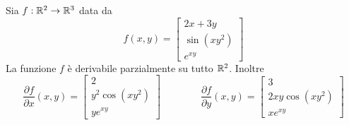 \begin{example}
	Sia $f: \mathbb{R}^2 \to \mathbb{R}^3$ data da
	\begin{equation*}
		f(x,y) =
		\begin{bmatrix}
			2x + 3y\\
			\sin (xy^2)\\
			e^{xy}
		\end{bmatrix}
	\end{equation*}
	La funzione $f$ è derivabile parzialmente su tutto $\mathbb{R}^2$. Inoltre
	\[
		\frac{\partial f}{\partial x}(x,y) =
		\begin{bmatrix}
			2\\
			y^2 \cos (xy^2)\\
			y e^{xy}
		\end{bmatrix}
		\qquad\qquad
		\frac{\partial f}{\partial y}(x,y) =
		\begin{bmatrix}
			3\\
			2xy \cos (xy^2)\\
			x e^{xy}
		\end{bmatrix}
	\]
\end{example}

